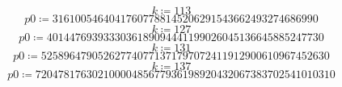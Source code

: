 \documentclass[11pt,a4paper,fleqn]{article}
\begin{document}
\begin{enumerate}[1.]
\begin{enumerate}[(a)]
\begin{flushleft}
\begin{mdframed}
\begin{dmath*}
                        k \coloneqq 113
                    \end{dmath*}
                    \vspace{-\bigskipamount}
                    \begin{dmath*}
                        \mathit{p0} \coloneqq 31610054640417607788145206291543662493274686990
                    \end{dmath*}
                    \vspace{-\bigskipamount}
                    \begin{dmath*}
                        k \coloneqq 127
                    \end{dmath*}
                    \vspace{-\bigskipamount}
                    \begin{dmath*}
                        \mathit{p0} \coloneqq 4014476939333036189094441199026045136645885247730
                    \end{dmath*}
                    \vspace{-\bigskipamount}
                    \begin{dmath*}
                        k \coloneqq 131
                    \end{dmath*}
                    \vspace{-\bigskipamount}
                    \begin{dmath*}
                        \mathit{p0} \coloneqq 525896479052627740771371797072411912900610967452630
                    \end{dmath*}
                    \vspace{-\bigskipamount}
                    \begin{dmath*}
                        k \coloneqq 137
                    \end{dmath*}
                    \vspace{-\bigskipamount}
                    \begin{dmath*}
                        \mathit{p0} \coloneqq 72047817630210000485677936198920432067383702541010310
                    \end{dmath*}
                    \vspace{-\bigskipamount}

\end{mdframed}
\end{flushleft}
\end{enumerate}
\end{enumerate}
\end{document}
